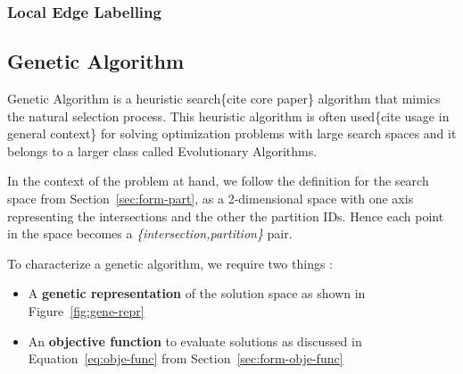 \subsubsection{Local Edge Labelling}
\label{sec:opti-loca-edge}

\subsection{Genetic Algorithm}
\label{sec:gen-algo}

\begin{scriptsize}
\begin{algorithm}[ht!]
\end{algorithm}
\end{scriptsize}

Genetic Algorithm is a heuristic search\{cite core paper\} algorithm that mimics the natural selection process. This heuristic algorithm is often used\{cite usage in general context\} for solving optimization problems with large search spaces and it belongs to a larger class called Evolutionary Algorithms.

In the context of the problem at hand, we follow the definition for the search space from Section~\ref{sec:form-part}, as a 2-dimensional space with one axis representing the intersections and the other the partition IDs. Hence each point in the space becomes a \textit{\{intersection,partition\}} pair.

\noindent To characterize a genetic algorithm, we require two things :
\begin{itemize}
	\item A \textbf{genetic representation} of the solution space as shown in Figure~\ref{fig:gene-repr}
	\item An \textbf{objective function} to evaluate solutions as discussed in Equation~\ref{eq:obje-func} from Section~\ref{sec:form-obje-func}
\end{itemize}

